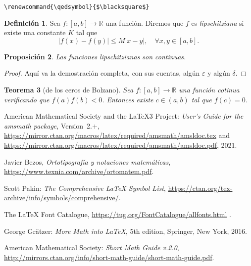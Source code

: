 \documentclass{article}
\numberwithin{equation}{section}
\theoremstyle{plain}
\newtheorem{teorema}{Teorema}[section]
\newtheorem{prop}[teorema]{Proposición}
\theoremstyle{definition}
\newtheorem{definicion}[teorema]{Definición}
\theoremstyle{remark}
\begin{document}
\begin{verbatim}
\renewcommand{\qedsymbol}{$\blacksquare$}
\end{verbatim}

\begin{codigo-arriba}
\begin{definicion}
Sea $f \colon [a,b] \to \mathbb{R}$ una función. Diremos que $f$ es \emph{lipschitziana} si existe una constante $K$ tal que 
\[
\left| f(x)-f(y) \right| \leq M \left| x-y \right|, \quad \forall x,y \in [a,b].
\]
\end{definicion}

\begin{prop}
Las funciones lipschitzianas son continuas.
\end{prop}
\begin{proof}
Aquí va la demostración completa, con sus cuentas, algún $\varepsilon$ y algún $\delta$.
\end{proof}

\begin{teorema}[de los ceros de Bolzano]
Sea $f \colon [a,b] \to \mathbb{R}$ una función cotinua verificando que $f(a)f(b)<0$. Entonces existe $c \in (a,b)$ tal que $f(c)=0$.
\end{teorema}
\end{codigo-arriba}


%




\begin{thebibliography}{99}
\raggedright

 American Mathematical Society and the \LaTeX3 Project:
  \emph{User's Guide for the \textnormal{\ttfamily amsmath} package},
  Version~2.$+$,
  \url{https://mirror.ctan.org/macros/latex/required/amsmath/amsldoc.tex} and
  \url{https://mirror.ctan.org/macros/latex/required/amsmath/amsldoc.pdf},
  2021.

 Javier Bezos, \emph{Ortotipografía y notaciones matemáticas}, \url{https://www.texnia.com/archive/ortomatem.pdf}.

 Scott Pakin:
  \emph{The Comprehensive \LaTeX{} Symbol List},
  \url{https://ctan.org/tex-archive/info/symbols/comprehensive/}.

 The \LaTeX{} Font Catalogue, 
  \url{https://tug.org/FontCatalogue/allfonts.html} .

 George Gr\"atzer: \textit{More Math into \LaTeX},
   5th edition, Springer, New York, 2016.

 American Mathematical Society: \emph{Short Math Guide v.2.0}, \url{http://mirrors.ctan.org/info/short-math-guide/short-math-guide.pdf}.

\end{thebibliography}
\end{document}
